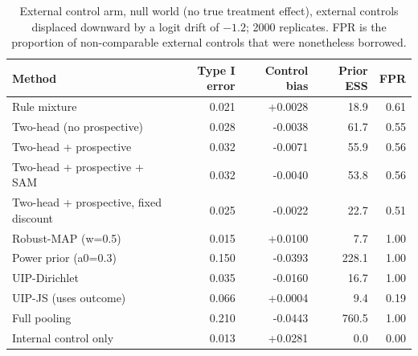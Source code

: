 \begin{table}[htbp]
\centering
\small
\caption{External control arm, null world (no true treatment effect), external controls displaced downward by a logit drift of $-1.2$; 2000 replicates. FPR is the proportion of non-comparable external controls that were nonetheless borrowed.}
\label{tab:gold-standard-external-control}
\begin{tabular}{lrrrr}
\toprule
Method & Type I error & Control bias & Prior ESS & FPR \\
\midrule
Rule mixture & 0.021 & +0.0028 & 18.9 & 0.61 \\
Two-head (no prospective) & 0.028 & -0.0038 & 61.7 & 0.55 \\
Two-head + prospective & 0.032 & -0.0071 & 55.9 & 0.56 \\
Two-head + prospective + SAM & 0.032 & -0.0040 & 53.8 & 0.56 \\
Two-head + prospective, fixed discount & 0.025 & -0.0022 & 22.7 & 0.51 \\
Robust-MAP (w=0.5) & 0.015 & +0.0100 & 7.7 & 1.00 \\
Power prior (a0=0.3) & 0.150 & -0.0393 & 228.1 & 1.00 \\
UIP-Dirichlet & 0.035 & -0.0160 & 16.7 & 1.00 \\
UIP-JS (uses outcome) & 0.066 & +0.0004 & 9.4 & 0.19 \\
Full pooling & 0.210 & -0.0443 & 760.5 & 1.00 \\
Internal control only & 0.013 & +0.0281 & 0.0 & 0.00 \\
\bottomrule
\end{tabular}
\end{table}

